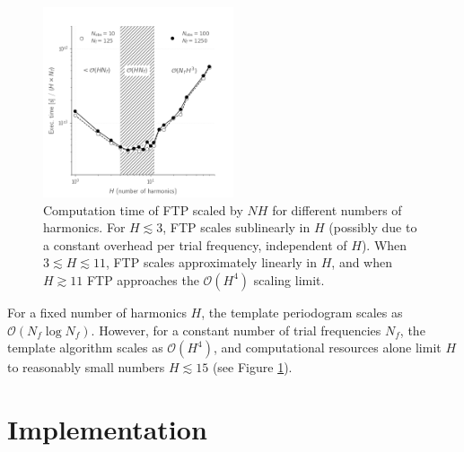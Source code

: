 \documentclass[iop]{emulateapj}
\newcommand{\bigO}{\mathcal{O}}
\begin{document}
\begin{figure}
    \centering
    \includegraphics[width=0.5\textwidth]{plots/timing_vs_nharm.png}
    \caption{\label{fig:timingnharm} Computation time of FTP scaled by $NH$ for
            different numbers of harmonics. For $H\lesssim 3$, FTP scales
            sublinearly in $H$ (possibly due to a constant overhead per
            trial frequency, independent of $H$). When $3 \lesssim H \lesssim 11$,
            FTP scales approximately linearly in $H$, and when $H \gtrsim 11$
            FTP approaches the $\bigO(H^4)$ scaling limit.}
\end{figure}

For a fixed number of harmonics $H$, the template periodogram scales as
$\bigO(N_f\log N_f)$. However, for a constant number of trial frequencies $N_f$, 
the template algorithm scales as $\bigO(H^4)$, and computational resources
alone limit $H$ to reasonably small numbers $H\lesssim15$ (see Figure \ref{fig:timingnharm}).


\section{Implementation}\label{sec:implementation}
\end{document}
